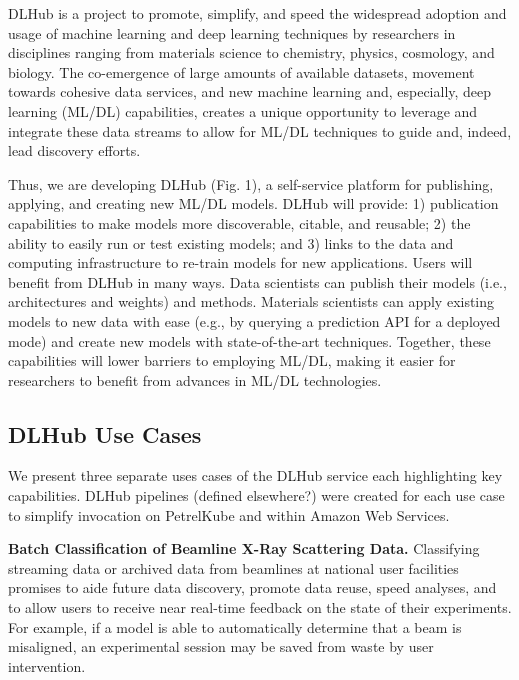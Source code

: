 \documentclass{aip-cp}
\newcommand\ben[1]{}
\newcommand\ben[1]{{\color{blue}[Ben: #1]}}
\begin{document}
DLHub is a project to promote, simplify, and speed the widespread adoption and usage of machine learning and deep learning techniques by researchers in disciplines ranging from materials science to chemistry, physics, cosmology, and biology. The co-emergence of large amounts of available datasets, movement towards cohesive data services, and new machine learning and, especially, deep learning (ML/DL) capabilities, creates a unique opportunity to leverage and integrate these data streams to allow for ML/DL techniques to guide and, indeed, lead discovery efforts.
 
Thus, we are developing DLHub (Fig. 1), a self-service platform for publishing, applying, and creating new ML/DL models. DLHub will provide: 1) publication capabilities to make models more discoverable, citable, and reusable; 2) the ability to easily run or test existing models; and 3) links to the data and computing infrastructure to re-train models for new applications. Users will benefit from DLHub in many ways. Data scientists can publish their models (i.e., architectures and weights) and methods. Materials scientists can apply existing models to new data with ease (e.g., by querying a prediction API for a deployed mode) and create new models with state-of-the-art techniques. Together, these capabilities will lower barriers to employing ML/DL, making it easier for researchers to benefit from advances in ML/DL technologies. 

\subsection{DLHub Use Cases}
We present three separate uses cases of the DLHub service each highlighting
key capabilities. DLHub pipelines (defined elsewhere?) were created for each
use case to simplify invocation on PetrelKube and within Amazon Web Services.
\ben{refine and add based on other paper components and DLHub architecture section}

\textbf{Batch Classification of Beamline X-Ray Scattering Data.}
Classifying streaming data or archived data from beamlines at national user
facilities promises to aide future data discovery, promote data reuse, speed
analyses, and to allow users to receive near real-time feedback on the state
of their experiments. For example, if a model is able to automatically
determine that a beam is misaligned, an experimental session may be saved from
waste by user intervention.
\end{document}
